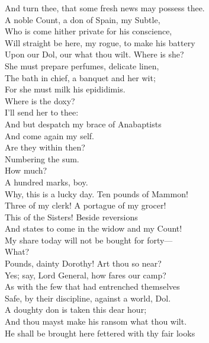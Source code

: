 \documentclass[a4paper,oneside,12pt]{memoir}
\begin{document}
\begin{drama*}
And turn thee, that some fresh news may possess thee.\\
A noble Count, a don of Spain, my Subtle,\\
Who is come hither private for his conscience,\\
Will straight be here, my rogue, to make his battery\\
Upon our Dol, our what thou wilt. Where is she?\\
She must prepare perfumes, delicate linen,\\
The bath in chief, a banquet and her wit;\\
For she must milk his epididimis.\\
Where is the doxy?\\
\subtlespeaks {} I'll send her to thee:\\
And but despatch my brace of Anabaptists\\
And come again my self.\\
\facespeaks {} Are they within then?\\
\subtlespeaks Numbering the sum.\\
\facespeaks {} How much?\\
\subtlespeaks {} A hundred marks, boy.\\
\facespeaks Why, this is a lucky day. Ten pounds of Mammon!\\
Three of my clerk! A portague of my grocer!\\
This of the Sisters! Beside reversions\\
And states to come in the widow and my Count!\\
My share today will not be bought for forty---\\
\dolspeaks What?\\
\facespeaks {} Pounds, dainty Dorothy! Art thou so near?\\
\dolspeaks Yes; say, Lord General, how fares our camp?\\
\facespeaks As with the few that had entrenched themselves\\
Safe, by their discipline, against a world, Dol.\\
A doughty don is taken this dear hour;\\
And thou mayst make his ransom what thou wilt.\\
He shall be brought here fettered with thy fair looks\\

\end{drama*}
\end{document}
